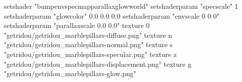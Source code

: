 setshader "bumpenvspecmapparallaxglowworld"
setshaderparam "specscale" 1
setshaderparam "glowcolor" 0.0 0.0 0.0
setshaderparam "envscale 0 0 0"
setshaderparam "parallaxscale 0.0 0.0"
texture 0 "getridou/getridou_marblepillars-diffuse.png"
texture n "getridou/getridou_marblepillars-normal.png"
texture s "getridou/getridou_marblepillars-specular.png"
texture z "getridou/getridou_marblepillars-displacement.png"
texture g "getridou/getridou_marblepillars-glow.png"

